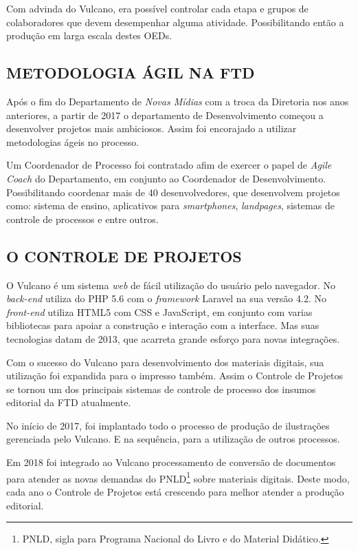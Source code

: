 \documentclass[
  12pt,            %
  openany,
  oneside,
  a4paper,         %
  english,      %
  brazil
]{article}
\numberwithin{figure}{section}
\numberwithin{table}{section}
\begin{document}
Com advinda do Vulcano, era possível controlar cada etapa e grupos de colaboradores que devem desempenhar alguma atividade. Possibilitando então a produção em larga escala destes OEDs.


\subsection{METODOLOGIA ÁGIL NA FTD}

Após o fim do Departamento de \textit{Novas Mídias} com a troca da Diretoria nos anos anteriores, a partir de 2017 o departamento de Desenvolvimento começou a desenvolver projetos mais ambiciosos. Assim foi encorajado a utilizar metodologias ágeis no processo.

Um Coordenador de Processo foi contratado afim de exercer o papel de \textit{Agile Coach} do Departamento, em conjunto ao Coordenador de Desenvolvimento. Possibilitando coordenar mais de 40 desenvolvedores, que desenvolvem projetos como: sistema de ensino, aplicativos para \textit{smartphones}, \textit{landpages}, sistemas de controle de processos e entre outros.


\subsection{O CONTROLE DE PROJETOS}

O Vulcano é um sistema \textit{web} de fácil utilização do usuário pelo navegador. No \textit{back-end} utiliza do PHP 5.6 com o \textit{framework} Laravel na sua versão 4.2. No \textit{front-end} utiliza HTML5 com CSS e JavaScript, em conjunto com varias bibliotecas para apoiar a construção e interação com a interface. Mas suas tecnologias datam de 2013, que acarreta grande esforço para novas integrações.

Com o sucesso do Vulcano para desenvolvimento dos materiais digitais, sua utilização foi expandida para o impresso também. Assim o Controle de Projetos se tornou um dos principais sistemas de controle de processo dos insumos editorial da FTD atualmente.

No início de 2017, foi implantado todo o processo de produção de ilustrações gerenciada pelo Vulcano. E na sequência, para a utilização de outros processos.

Em 2018 foi integrado ao Vulcano processamento de conversão de documentos para atender as novas demandas do PNLD\footnote{PNLD, sigla para Programa Nacional do Livro e do Material Didático.} sobre materiais digitais. Deste modo, cada ano o Controle de Projetos está crescendo para melhor atender a produção editorial.
\end{document}
